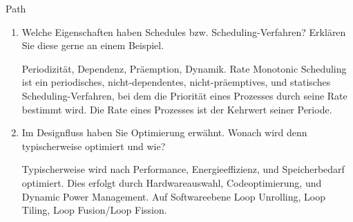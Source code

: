 \documentclass{article}
\begin{document}
\begin{exercise}{Path}
\begin{enumerate}
    \item Welche Eigenschaften haben Schedules bzw. Scheduling-Verfahren? Erklären Sie diese gerne an einem Beispiel.
          \begin{solution}
            Periodizität, Dependenz, Präemption, Dynamik. Rate Monotonic Scheduling ist ein periodisches, nicht-dependentes, nicht-präemptives, und statisches Scheduling-Verfahren, bei dem die Priorität eines Prozesses durch seine Rate bestimmt wird. Die Rate eines Prozesses ist der Kehrwert seiner Periode.
          \end{solution}

    \item Im Designfluss haben Sie Optimierung erwähnt. Wonach wird denn typischerweise optimiert und wie?
          \begin{solution}
            Typischerweise wird nach Performance, Energieeffizienz, und Speicherbedarf optimiert. Dies erfolgt durch Hardwareauswahl, Codeoptimierung, und Dynamic Power Management. Auf Softwareebene Loop Unrolling, Loop Tiling, Loop Fusion/Loop Fission.
          \end{solution}
  \end{enumerate}
\end{exercise}
\end{document}
